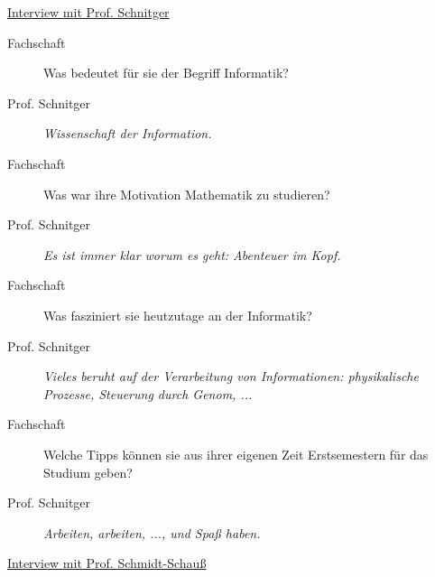 \begin{flushleft}\underline{Interview mit Prof. Schnitger} \end{flushleft}

\begin{description}

\item[Fachschaft] 

Was bedeutet für sie der Begriff Informatik?

\item[Prof. Schnitger]
 
\textit{Wissenschaft der Information.}

\item[Fachschaft]

Was war ihre Motivation Mathematik zu studieren?

\item[Prof. Schnitger]

\textit{Es ist immer klar worum es geht: Abenteuer im Kopf.}

\item[Fachschaft]

Was fasziniert sie heutzutage an der Informatik?

\item[Prof. Schnitger]

\textit{Vieles beruht auf der Verarbeitung von Informationen: physikalische Prozesse, Steuerung durch Genom, ...}

\item[Fachschaft]

Welche Tipps können sie aus ihrer eigenen Zeit Erstsemestern für das Studium geben?

\item[Prof. Schnitger]

\textit{Arbeiten, arbeiten, ..., und Spaß haben.}

\end{description}



\begin{flushleft}\underline{Interview mit Prof. Schmidt-Schauß} \end{flushleft}


